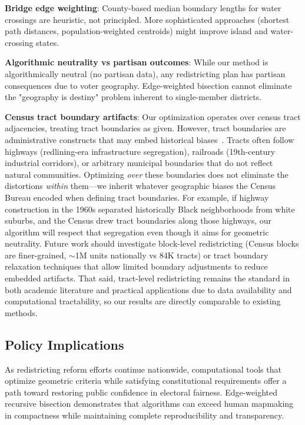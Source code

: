 \textbf{Bridge edge weighting}: County-based median boundary lengths for water crossings are heuristic, not principled. More sophisticated approaches (shortest path distances, population-weighted centroids) might improve island and water-crossing states.

\textbf{Algorithmic neutrality vs partisan outcomes}: While our method is algorithmically neutral (no partisan data), any redistricting plan has partisan consequences due to voter geography. Edge-weighted bisection cannot eliminate the "geography is destiny" problem inherent to single-member districts.

\textbf{Census tract boundary artifacts}: Our optimization operates over census tract adjacencies, treating tract boundaries as given. However, tract boundaries are administrative constructs that may embed historical biases~\cite{logan2011separate}. Tracts often follow highways (redlining-era infrastructure segregation), railroads (19th-century industrial corridors), or arbitrary municipal boundaries that do not reflect natural communities. Optimizing \textit{over} these boundaries does not eliminate the distortions \textit{within} them—we inherit whatever geographic biases the Census Bureau encoded when defining tract boundaries. For example, if highway construction in the 1960s separated historically Black neighborhoods from white suburbs, and the Census drew tract boundaries along those highways, our algorithm will respect that segregation even though it aims for geometric neutrality. Future work should investigate block-level redistricting (Census blocks are finer-grained, $\sim$1M units nationally vs 84K tracts) or tract boundary relaxation techniques that allow limited boundary adjustments to reduce embedded artifacts. That said, tract-level redistricting remains the standard in both academic literature and practical applications due to data availability and computational tractability, so our results are directly comparable to existing methods.

\subsection{Policy Implications}

As redistricting reform efforts continue nationwide, computational tools that optimize geometric criteria while satisfying constitutional requirements offer a path toward restoring public confidence in electoral fairness. Edge-weighted recursive bisection demonstrates that algorithms can exceed human mapmaking in compactness while maintaining complete reproducibility and transparency.

